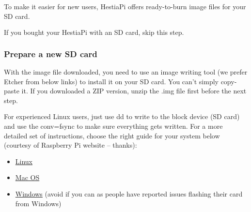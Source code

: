To make it easier for new users, HestiaPi offers ready-to-burn image files for your SD card.

If you bought your HestiaPi with an SD card, skip this step.


\subsubsection{Prepare a new SD card}

With the image file downloaded, you need to use an image writing tool (we prefer Etcher from below links) to install it on your SD card. You can't simply copy-paste it. If you downloaded a ZIP version, unzip the .img file first before the next step.

For experienced Linux users, just use dd to write to the block device (SD card)
and use the conv=fsync to make sure everything gets written.  For a more
detailed set of instructions, choose the right guide for your system below
(courtesy of Raspberry Pi website -- thanks):

\begin{itemize}
\item \href{http://www.raspberrypi.org/documentation/installation/installing-images/linux.md}{Linux}
\item \href{http://www.raspberrypi.org/documentation/installation/installing-images/mac.md}{Mac OS}
\item \href{http://www.raspberrypi.org/documentation/installation/installing-images/windows.md}{Windows} (avoid if you can as people have reported issues flashing their card from Windows)
\end{itemize}

